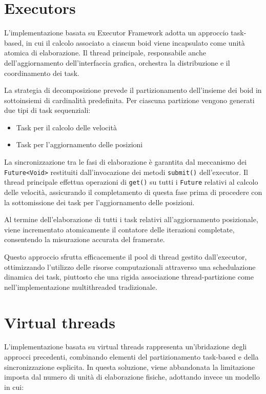 \documentclass[a4paper,12pt]{report}
\begin{document}
\section{Executors}

L'implementazione basata su Executor Framework adotta un approccio task-based, in cui il calcolo associato a ciascun boid viene incapsulato come unità atomica di elaborazione. Il thread principale, responsabile anche dell'aggiornamento dell'interfaccia grafica, orchestra la distribuzione e il coordinamento dei task.

La strategia di decomposizione prevede il partizionamento dell'insieme dei boid in sottoinsiemi di cardinalità predefinita. Per ciascuna partizione vengono generati due tipi di task sequenziali:
\begin{itemize}
    \item Task per il calcolo delle velocità
    \item Task per l'aggiornamento delle posizioni
\end{itemize}

La sincronizzazione tra le fasi di elaborazione è garantita dal meccanismo dei \texttt{Future<Void>} restituiti dall'invocazione dei metodi \texttt{submit()} dell'executor. Il thread principale effettua operazioni di \texttt{get()} su tutti i \texttt{Future} relativi al calcolo delle velocità, assicurando il completamento di questa fase prima di procedere con la sottomissione dei task per l'aggiornamento delle posizioni.

Al termine dell'elaborazione di tutti i task relativi all'aggiornamento posizionale, viene incrementato atomicamente il contatore delle iterazioni completate, consentendo la misurazione accurata del framerate.

Questo approccio sfrutta efficacemente il pool di thread gestito dall'executor, ottimizzando l'utilizzo delle risorse computazionali attraverso una schedulazione dinamica dei task, piuttosto che una rigida associazione thread-partizione come nell'implementazione multithreaded tradizionale.

\section{Virtual threads}
L'implementazione basata su virtual threads rappresenta un'ibridazione degli approcci precedenti, combinando elementi del partizionamento task-based e della sincronizzazione esplicita. In questa soluzione, viene abbandonata la limitazione imposta dal numero di unità di elaborazione fisiche, adottando invece un modello in cui:
\end{document}
